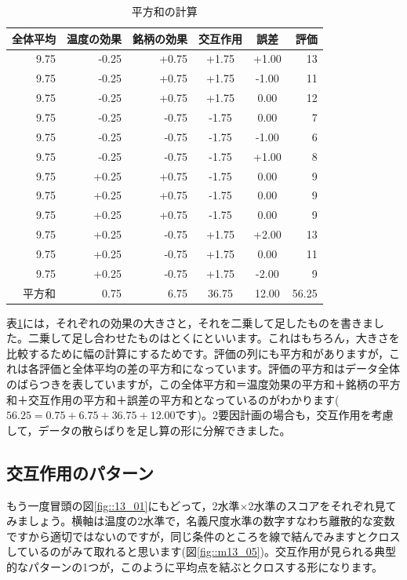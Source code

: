 \documentclass{ltjbook}
\begin{document}
\begin{table}[ht]
	\centering
	\caption{平方和の計算}
	\begin{tabular}{rrrccr}
		\hline
		全体平均 & 温度の効果 & 銘柄の効果 & 交互作用 & 誤差  & 評価  \\
		\hline
		9.75     & -0.25      & +0.75      & +1.75    & +1.00 & 13    \\
		9.75     & -0.25      & +0.75      & +1.75    & -1.00 & 11    \\
		9.75     & -0.25      & +0.75      & +1.75    & 0.00  & 12    \\ \hline
		9.75     & -0.25      & -0.75      & -1.75    & 0.00  & 7     \\
		9.75     & -0.25      & -0.75      & -1.75    & -1.00 & 6     \\
		9.75     & -0.25      & -0.75      & -1.75    & +1.00 & 8     \\ \hline
		9.75     & +0.25      & +0.75      & -1.75    & 0.00  & 9     \\
		9.75     & +0.25      & +0.75      & -1.75    & 0.00  & 9     \\
		9.75     & +0.25      & +0.75      & -1.75    & 0.00  & 9     \\ \hline
		9.75     & +0.25      & -0.75      & +1.75    & +2.00 & 13    \\
		9.75     & +0.25      & -0.75      & +1.75    & 0.00  & 11    \\
		9.75     & +0.25      & -0.75      & +1.75    & -2.00 & 9     \\
		\hline\hline
		平方和   & 0.75       & 6.75       & 36.75    & 12.00 & 56.25 \\\hline
	\end{tabular}
	\label{tbl::13_04}
\end{table}
表\ref{tbl::13_04}には，それぞれの効果の大きさと，それを二乗して足したものを書きました。二乗して足し合わせたものはとくにといいます。これはもちろん，大きさを比較するために幅の計算にするためです。評価の列にも平方和がありますが，これは各評価と全体平均の差の平方和になっています。評価の平方和はデータ全体のばらつきを表していますが，この全体平方和＝温度効果の平方和＋銘柄の平方和＋交互作用の平方和＋誤差の平方和となっているのがわかります($56.25=0.75+6.75+36.75+12.00$です)。2要因計画の場合も，交互作用を考慮して，データの散らばりを足し算の形に分解できました。

\subsection{交互作用のパターン}
もう一度冒頭の図\ref{fig::13_01}にもどって，2水準$\times$2水準のスコアをそれぞれ見てみましょう。横軸は温度の2水準で，名義尺度水準の数字すなわち離散的な変数ですから適切ではないのですが，同じ条件のところを線で結んでみますとクロスしているのがみて取れると思います(図\ref{fig::m13_05})。交互作用が見られる典型的なパターンの1つが，このように平均点を結ぶとクロスする形になります。
\end{document}
